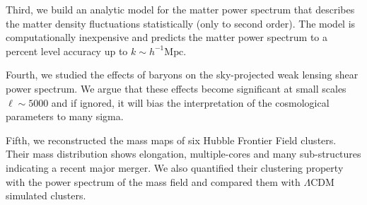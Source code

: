 Third, we build an analytic model for the matter power spectrum that
describes the matter density fluctuations statistically (only to second 
order). The model is computationally inexpensive and predicts the
matter power spectrum to a percent level accuracy up to 
$k\sim h^{-1}\mathrm{Mpc}$. 

Fourth, we studied the effects of baryons on the sky-projected weak lensing
shear power spectrum. We argue that these effects become significant
at small scales $\ell \sim 5000$ and if ignored, it will bias the
interpretation of the cosmological parameters to many sigma.

Fifth, we reconstructed the mass maps of six Hubble Frontier Field clusters.
Their mass distribution shows elongation, multiple-cores and many sub-structures
indicating a recent major merger. We also quantified their clustering 
property with the power spectrum of the mass field and compared them
with $\Lambda$CDM simulated clusters.


